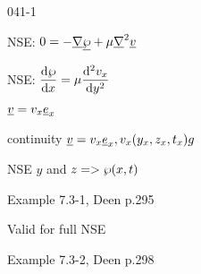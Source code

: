 \begin{mitframe}{041-1}

            
\begin{listone}

\item NSE: $0=-\gradop\uline{\dynpress}+\chempot\gradop^2\uline{\vvel}$

\item NSE: $\dfrac{\mathrm{d}\dynpress}{\mathrm{d}\disp}=\chempot\dfrac{\mathrm{d}^2\vvel_{\disp}}{\mathrm{d}y^2}$
			\begin{listtwo}
			\item $\uline{\vvel}=\vvel_{\disp}\mcef_{\disp}$
            
            \item continuity $\uline{\vvel}=\vvel_{\disp}\mcef_{\disp}, \vvel_{\disp}(y_{\disp},z_{\disp}, t_{\disp})\grav$
            
            \item NSE $y$ and $z=>\dynpress(\disp,t)$
            
            \item Example 7.3-1, Deen p.295
            
            			\begin{listthree}
                        \item Valid for full NSE
                        \end{listthree}
            
            \item Example 7.3-2, Deen p.298
            \end{listtwo}
\end{listone}
\end{mitframe}